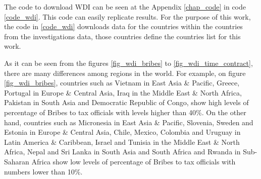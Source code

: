 The code to download WDI can be seen at the Appendix \ref{chap_code} in code \ref{code_wdi}. This code can easily replicate results. For the purpose of this work, the code in \ref{code_wdi} downloads data for the countries within the countries from the investigations data, those countries define the countries list for this work.

As it can be seen from the figures \ref{fig_wdi_bribes} to \ref{fig_wdi_time_contract}, there are many differences among regions in the world. 
For example, on figure \ref{fig_wdi_bribes}, countries such as Vietnam in East Asia \& Pacific, Greece, Portugal in Europe \& Central Asia, Iraq in the Middle East \& North Africa, Pakistan in South Asia and Democratic Republic of Congo, show high levels of percentage of Bribes to tax officials with levels higher than 40\%. On the other hand, countries such as Micronesia in East Asia \& Pacific, Slovenia, Sweden and Estonia in Europe \& Central Asia, Chile, Mexico, Colombia and Uruguay in Latin America \& Caribbean, Israel and Tunisia in the Middle East \& North Africa, Nepal and Sri Lanka in South Asia and South Africa and Rwanda in Sub-Saharan Africa show low levels of percentage of Bribes to tax officials with numbers lower than 10\%.

